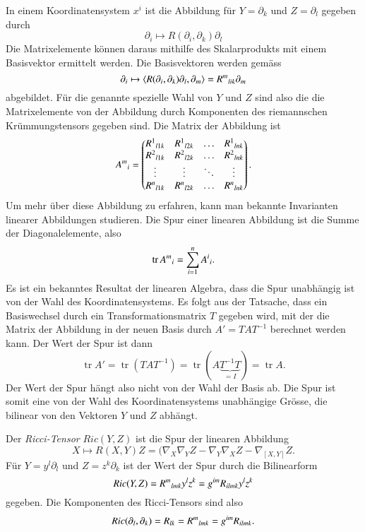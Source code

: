 In einem Koordinatensystem $x^i$ ist die
Abbildung für $Y=\partial_k$ und $Z=\partial_l$  gegeben durch
\[
\partial_i
\mapsto
R(\partial_i,\partial_k)\partial_l
\]
Die Matrixelemente können daraus mithilfe des Skalarprodukts mit
einem Basisvektor ermittelt werden.
Die Basisvektoren werden gemäss
\[
\partial_i
\mapsto
\langle
R(\partial_i,\partial_k)\partial_l,
\partial_m
\rangle
=
R^{m}\mathstrut_{lik}\partial_m
\]
abgebildet.
Für die genannte spezielle Wahl von $Y$ und $Z$ sind also die 
die Matrixelemente von der Abbildung durch Komponenten des
riemannschen Krümmungstensors gegeben sind.
Die Matrix der Abbildung ist
\[
A^m\mathstrut_i
=
\begin{pmatrix}
R^1\mathstrut_{l1k} & R^1\mathstrut_{l2k} & \dots  & R^1\mathstrut_{lnk} \\
R^2\mathstrut_{l1k} & R^2\mathstrut_{l2k} & \dots  & R^2\mathstrut_{lnk} \\
\vdots              & \vdots              & \ddots & \vdots              \\
R^n\mathstrut_{l1k} & R^n\mathstrut_{l2k} & \dots  & R^n\mathstrut_{lnk} 
\end{pmatrix}.
\]
Um mehr über diese Abbildung zu erfahren, kann man bekannte
Invarianten linearer Abbildungen studieren.
Die Spur einer linearen Abbildung ist die Summe der Diagonalelemente,
also
\[
\operatorname{tr} A^m\mathstrut_i
=
\sum_{i=1}^n A^i\mathstrut_i.
\]
Es ist ein bekanntes Resultat der linearen Algebra, dass die Spur
unabhängig ist von der Wahl des Koordinatensystems.
Es folgt aus der Tatsache, dass ein Basiswechsel durch ein
Transformationsmatrix $T$ gegeben wird, mit der die Matrix der
Abbildung in der neuen Basis durch $A'=TAT^{-1}$ berechnet
werden kann.
Der Wert der Spur ist dann
\[
\operatorname{tr} A'
=
\operatorname{tr}(TAT^{-1})
=
\operatorname{tr}(A\underbrace{T^{-1}T}_{\displaystyle=I})
=
\operatorname{tr}A.
\]
Der Wert der Spur hängt also nicht von der Wahl der Basis ab.
Die Spur ist somit eine von der Wahl des Koordinatensystems
unabhängige Grösse, die bilinear von den Vektoren $Y$ und $Z$
abhängt.

\begin{definition}
Der \emph{Ricci-Tensor} $Ric(Y,Z)$ ist die Spur der linearen Abbildung
\[
X \mapsto R(X,Y)Z = (\nabla_X\nabla_YZ-\nabla_Y\nabla_XZ-\nabla_{[X,Y]}Z.
\]
Für $Y=y^l\partial_l$ und $Z=z^k\partial_k$ ist der Wert der Spur
durch die Bilinearform
\[
Ric(Y,Z)
=
R^m\mathstrut_{lmk} y^lz^k
=
g^{im}
R_{ilmk}y^lz^k
\]
gegeben.
Die Komponenten des Ricci-Tensors sind also
\[
Ric(\partial_l,\partial_k)
=
R_{lk}
=
R^m\mathstrut_{lmk}
=
g^{im}
R_{ilmk}.
\]
\end{definition}

